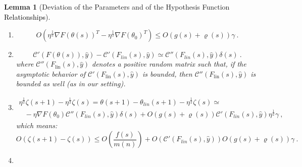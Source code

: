 \documentclass{article} %
\newtheorem{lemma}[theorem]{Lemma}
\begin{document}
\begin{lemma}[Deviation of the Parameters and of the Hypothesis Function \textcolor{black}{Relationships}]
{\begin{enumerate}
\item 
\label{Zap:DeviationSmallPermu2}
\begin{equation}
O\left(\eta^{\frac{1}{2}}\nabla F\left(\theta\left(s\right)\right)^{T}-\eta^{\frac{1}{2}}\nabla F\left(\theta_{0}\right)^{T}\right)\leq O\left(g\left(s\right)+\varrho\left(s\right)\right)\gamma \ .
\end{equation}
\item
\label{Zap:DeviationSmallPermu3}
\begin{equation}
\mathcal{C}'\left(F\left(\theta\left(s\right)\right),\hat{y}\right)-\mathcal{C}'\left(F_{lin}\left(s\right),\hat{y}\right)\simeq\mathcal{C}''\left(F_{lin}\left(s\right),\hat{y}\right)\delta\left(s\right) \ .
\end{equation}
where \(\mathcal{C}''\left(F_{\text{lin}}(s),\hat{y}\right)\) denotes a positive random matrix such that, if the asymptotic behavior of \(\mathcal{C}'\left(F_{\text{lin}}(s),\hat{y}\right)\) is bounded, then \(\mathcal{C}''\left(F_{\text{lin}}(s),\hat{y}\right)\) is bounded as well (as in our setting).
\item
\label{Zap:DeviationSmallPermu4}
\begin{equation}
\begin{array}{c}
\eta^{\frac{1}{2}}\zeta\left(s+1\right)-\eta^{\frac{1}{2}}\zeta\left(s\right)
=
\theta\left(s+1\right)-\theta_{lin}\left(s+1\right)-\eta^{\frac{1}{2}}\zeta\left(s\right)\simeq\\
\begin{array}{c}
\\
\\
\end{array}-\eta\nabla F\left(\theta_{0}\right)\mathcal{C}''\left(F_{lin}\left(s\right),\hat{y}\right)\delta\left(s\right)+O\left(g\left(s\right)+\varrho\left(s\right)\right)\mathcal{C}'\left(F_{lin}\left(s\right),\hat{y}\right)\eta^{\frac{1}{2}}\gamma \ ,
\end{array}
\end{equation}
which means:
\begin{equation}
O\left(\zeta\left(s+1\right)-\zeta\left(s\right)\right)\leq O\left(\frac{f\left(s\right)}{m\left(n\right)}\right)+O\left(\mathcal{C}'\left(F_{lin}\left(s\right),\hat{y}\right)\right)O\left(g\left(s\right)+\varrho\left(s\right)\right)\gamma \ .
\end{equation}
\item 
\label{Zap:DeviationSmallPermu5}
\begin{equation}
\begin{array}{c}

\end{array}
\end{equation}
\end{enumerate}}
\end{lemma}
\end{document}
